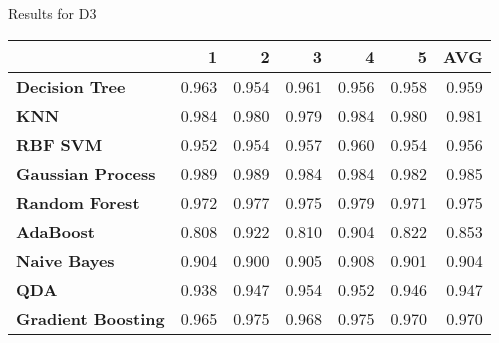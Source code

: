 Results for D3
\begin{tabular}{lrrrrrr}
\toprule
{} &      1 &      2 &      3 &      4 &      5 &    AVG \\
\midrule
\textbf{Decision Tree    } &  0.963 &  0.954 &  0.961 &  0.956 &  0.958 &  0.959 \\
\textbf{KNN              } &  0.984 &  0.980 &  0.979 &  0.984 &  0.980 &  0.981 \\
\textbf{RBF SVM          } &  0.952 &  0.954 &  0.957 &  0.960 &  0.954 &  0.956 \\
\textbf{Gaussian Process } &  0.989 &  0.989 &  0.984 &  0.984 &  0.982 &  0.985 \\
\textbf{Random Forest    } &  0.972 &  0.977 &  0.975 &  0.979 &  0.971 &  0.975 \\
\textbf{AdaBoost         } &  0.808 &  0.922 &  0.810 &  0.904 &  0.822 &  0.853 \\
\textbf{Naive Bayes      } &  0.904 &  0.900 &  0.905 &  0.908 &  0.901 &  0.904 \\
\textbf{QDA              } &  0.938 &  0.947 &  0.954 &  0.952 &  0.946 &  0.947 \\
\textbf{Gradient Boosting} &  0.965 &  0.975 &  0.968 &  0.975 &  0.970 &  0.970 \\
\bottomrule
\end{tabular}

